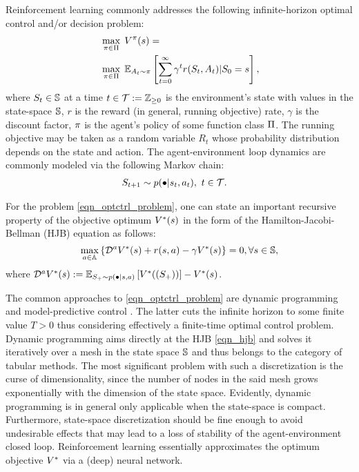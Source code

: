 \documentclass[12pt,twoside]{../../mitthesis}
\begin{document}
Reinforcement learning commonly addresses the following infinite-horizon optimal control and/or decision problem:
\begin{equation}
	\label{eqn_optctrl_problem}
	\begin{aligned}
	& \, \max_{\policy \in \policies} \; \Value^\policy (\state) = \\
	& \, \max_{\policy \in \policies} \; \E[\Action_t \sim \policy]{\sum\limits_{t=0}^{\infty} \gamma^t r(\State_t, \Action_t) \vert \State_0=\state},
	\end{aligned}
\end{equation}
where $\State_t \in \states$ at a time $t \in \T := \Z_{\ge0}$ is the environment's state with values in the state-space $\states$, $r$ is the reward (in general, running objective) rate, $\gamma$ is the discount factor, $\policy$ is the agent's policy of some function class $\policies$.
The running objective may be taken as a random variable $R_t$ whose probability distribution depends on the state and action.
The agent-environment loop dynamics are commonly modeled via the following Markov chain:
\begin{equation}
	\label{eqn_sysmarkov}
	\begin{aligned}
		& \State_{t+1} \sim \transit(\bullet \vert \state_t, \action_t), \spc t \in \T.
	\end{aligned}
\end{equation}

For the problem \eqref{eqn_optctrl_problem}, one can state an important recursive property of the objective optimum $\Value^*(\state)$ in the form of the Hamilton-Jacobi-Bellman (HJB) equation as follows:
\begin{equation}
    \label{eqn_hjb}
    \max_{\action \in \actions}{\{ \mathcal D^\action \Value^*(\state) + r(\state, \action) - \gamma \Value^*(\state)\}} = 0, \forall \state \in \states,
\end{equation}
where $\mathcal D^\action \Value^*(\state) := \E[S_+ \sim \transit(\bullet \vert \state, \action)]{\Value^*((\State_{+}))} - \Value^*(\state)$.

The common approaches to \eqref{eqn_optctrl_problem} are dynamic programming \cite{Bertsekas2019Reinforcementl,Lewis2009Reinforcementl} and model-predictive control \cite{Garcia1989Modelpredictiv,Borrelli2011PredictiveCont,Darby2012MPCCurrentpra,Mayne2014Modelpredictiv}.
The latter cuts the infinite horizon to some finite value $T>0$ thus considering effectively a finite-time optimal control problem.
Dynamic programming aims directly at the HJB \eqref{eqn_hjb} and solves it iteratively over a mesh in the state space $\states$ and thus belongs to the category of tabular methods.
The most significant problem with such a discretization is the curse of dimensionality, since the number of nodes in the said mesh grows exponentially with the dimension of the state space.
Evidently, dynamic programming is in general only applicable when the state-space is compact.
Furthermore, state-space discretization should be fine enough to avoid undesirable effects that may lead to a loss of stability of the agent-environment closed loop.
Reinforcement learning essentially approximates the optimum objective $\Value^*$ via a (deep) neural network.
\end{document}
